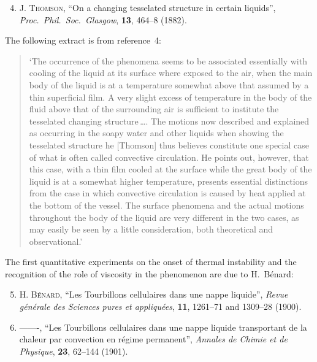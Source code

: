 \begin{enumerate}
\setcounter{enumi}{3}

\item \textsc{J. Thomson}, ``On a changing tesselated structure in certain liquids'',
  \textit{Proc.\ Phil.\ Soc.\ Glasgow}, \textbf{13}, 464--8 (1882).

\end{enumerate}

\noindent The following extract is from reference~4:

\begin{quote}
`The occurrence of the phenomena seems to be associated essentially with
cooling of the liquid at its surface where exposed to the air, when the main
body of the liquid is at a temperature somewhat above that assumed by a thin
superficial film. A very slight excess of temperature in the body of the fluid
above that of the surrounding air is sufficient to institute the tesselated
changing structure\,\ldots. The motions now described and explained as occurring
in the soapy water and other liquids when showing the tesselated structure
he [Thomson] thus believes constitute one special case of what is often called
convective circulation. He points out, however, that this case, with a thin
film cooled at the surface while the great body of the liquid is at a somewhat
higher temperature, presents essential distinctions from the case in which
convective circulation is caused by heat applied at the bottom of the vessel.
The surface phenomena and the actual motions throughout the body of the
liquid are very different in the two cases, as may easily be seen by a little
consideration, both theoretical and observational.'
\end{quote}

\noindent The first quantitative experiments on the onset of thermal instability and the
recognition of the role of viscosity in the phenomenon are due to H.~B\'enard:

\begin{enumerate}
\setcounter{enumi}{4}

\item \textsc{H. B\'enard}, ``Les Tourbillons cellulaires dans une nappe liquide'',
  \textit{Revue g\'en\'erale des Sciences pures et appliqu\'ees}, \textbf{11},
  1261--71 and 1309--28 (1900).

\item -------, ``Les Tourbillons cellulaires dans une nappe liquide transportant de
  la chaleur par convection en r\'egime permanent'', \textit{Annales de Chimie et de
  Physique}, \textbf{23}, 62--144 (1901).

\end{enumerate}

